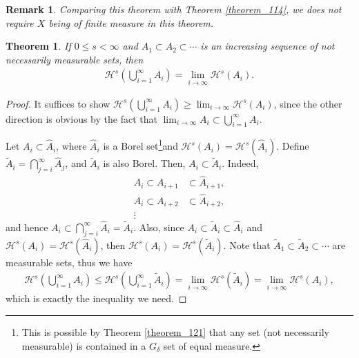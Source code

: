 \documentclass[11pt]{book}
\newtheorem{theorem}{Theorem}[chapter]
\newtheorem{remark}{Remark}[chapter]
\theoremstyle{definition}
\numberwithin{equation}{chapter}
\def\H{{\mathcal H}}
\begin{document}
\medskip

\begin{remark}
Comparing this theorem with Theorem \ref{theorem_114}, we does not require $X$ being of finite measure in this theorem.
\end{remark}

\medskip

\begin{theorem}
If $0 \leq s < \infty$ and $A_1 \subset A_2 \subset \cdots$ is an increasing sequence of not necessarily measurable sets, then
\begin{align*}
    \H^s \left(\bigcup^\infty_{i=1}A_i\right) = \lim_{i\to\infty} \H^s(A_i).
\end{align*}
\end{theorem}
\begin{proof}
It suffices to show $\H^s \left(\bigcup^\infty_{i=1}A_i\right) \geq \lim_{i\to\infty} \H^s(A_i)$, since the other direction is obvious by the fact that $\lim_{i\to\infty}A_i \subset \bigcup^\infty_{i=1}A_i$.

Let $A_i \subset \widehat{A}_i$, where $\widehat{A}_i$ is a Borel set\footnote{This is possible by Theorem \ref{theorem_121} that any set (not necessarily measurable) is contained in a $G_\delta$ set of equal measure.}and $\H^s(A_i) = \H^s(\widehat{A}_i)$. Define $\widetilde{A}_i = \bigcap^\infty_{j=i} \widehat{A}_j$, and $\widetilde{A}_i$ is also Borel. Then, $A_i \subset \widetilde{A}_i$. Indeed,
\begin{align*}
    A_i \subset A_{i+1} & \subset \widehat{A}_{i+1}, \\
    A_i \subset A_{i+2} & \subset \widehat{A}_{i+2}, \\
    \vdots & 
\end{align*}
and hence $A_i \subset \bigcap^\infty_{j=i} \widehat{A}_i = \widetilde{A}_i$. Also, since $A_i \subset \widetilde{A}_i \subset \widehat{A}_i$ and $\H^s(A_i) = \H^s(\widehat{A}_i)$, then $\H^s(A_i) = \H^s(\widetilde{A}_i)$. Note that $\widetilde{A}_1 \subset \widetilde{A}_2 \subset \cdots$ are measurable sets, thus we have 
\begin{align*}
    \H^s\left(\bigcup^\infty_{i=1}A_i\right) \leq \H^s\left(\bigcup^\infty_{i=1}\widetilde{A}_i\right) = \lim_{i\to\infty} \H^s(\widetilde{A}_i) = \lim_{i\to\infty} \H^s(A_i),
\end{align*}
which is exactly the inequality we need.
\end{proof}

\medskip
\end{document}
